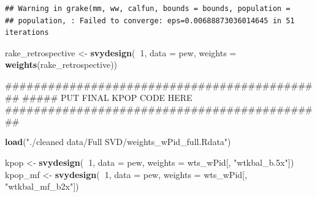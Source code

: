 \documentclass[]{article}
\newenvironment{Shaded}{\begin{snugshade}}{\end{snugshade}}
\newcommand{\DataTypeTok}[1]{\textcolor[rgb]{0.13,0.29,0.53}{#1}}
\newcommand{\DecValTok}[1]{\textcolor[rgb]{0.00,0.00,0.81}{#1}}
\newcommand{\KeywordTok}[1]{\textcolor[rgb]{0.13,0.29,0.53}{\textbf{#1}}}
\newcommand{\NormalTok}[1]{#1}
\newcommand{\OperatorTok}[1]{\textcolor[rgb]{0.81,0.36,0.00}{\textbf{#1}}}
\newcommand{\StringTok}[1]{\textcolor[rgb]{0.31,0.60,0.02}{#1}}
\begin{document}
\begin{verbatim}
## Warning in grake(mm, ww, calfun, bounds = bounds, population =
## population, : Failed to converge: eps=0.00688873036014645 in 51 iterations
\end{verbatim}

\begin{Shaded}
\begin{Highlighting}[]
\NormalTok{rake_retrospective <-}\StringTok{ }\KeywordTok{svydesign}\NormalTok{(}\OperatorTok{~}\DecValTok{1}\NormalTok{, }\DataTypeTok{data =}\NormalTok{ pew, }\DataTypeTok{weights =} \KeywordTok{weights}\NormalTok{(rake_retrospective))}
\end{Highlighting}
\end{Shaded}

\begin{Shaded}
\begin{Highlighting}[]
\NormalTok{#############################################}
\NormalTok{##### PUT FINAL KPOP CODE HERE}
\NormalTok{#############################################}

\KeywordTok{load}\NormalTok{(}\StringTok{"./cleaned data/Full SVD/weights_wPid_full.Rdata"}\NormalTok{)}

\NormalTok{kpop <-}\StringTok{ }\KeywordTok{svydesign}\NormalTok{(}\OperatorTok{~}\DecValTok{1}\NormalTok{, }\DataTypeTok{data =}\NormalTok{ pew, }\DataTypeTok{weights =}\NormalTok{ wts_wPid[, }\StringTok{"wtkbal_b.5x"}\NormalTok{])}
\NormalTok{kpop_mf <-}\StringTok{ }\KeywordTok{svydesign}\NormalTok{(}\OperatorTok{~}\DecValTok{1}\NormalTok{, }\DataTypeTok{data =}\NormalTok{ pew, }\DataTypeTok{weights =}\NormalTok{ wts_wPid[, }\StringTok{"wtkbal_mf_b2x"}\NormalTok{])}
\end{Highlighting}
\end{Shaded}
\end{document}
